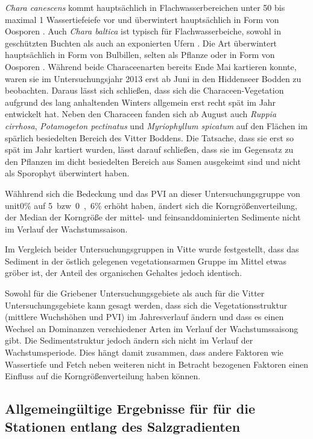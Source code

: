 \textit{Chara canescens} kommt hauptsächlich in Flachwasserbereichen unter \unit{50}{\centi\metre}  bis maximal \unit{1}{\metre} Wassertiefeiefe \citep{blindow_2003} vor und überwintert hauptsächlich in Form von Oosporen \cite{wahlstedt_1862}. Auch \textit{Chara baltica} ist typisch für Flachwasserbeiche, sowohl in geschützten Buchten als auch an exponierten Ufern \citep{blumel_2003}. Die Art überwintert hauptsächlich in Form von Bulbillen, selten als Pflanze oder in Form von Oosporen \cite{blumel_2003}. Während \cite{flugge_2004} beide Characeenarten  bereits Ende Mai kartieren konnte, waren sie im Untersuchungsjahr 2013 erst ab Juni in den Hiddenseer Bodden zu beobachten. Daraus lässt sich schließen, dass sich die Characeen-Vegetation aufgrund des lang anhaltenden Winters allgemein erst recht spät im Jahr entwickelt hat.
Neben den Characeen fanden sich ab August auch \textit{Ruppia cirrhosa}, \textit{Potamogeton pectinatus} und \textit{Myriophyllum spicatum} auf den Flächen im spärlich besiedelten Bereich des Vitter Boddens. Die Tatsache, dass sie erst so spät im Jahr kartiert wurden, lässt darauf schließen, dass sie im Gegensatz zu den Pflanzen im dicht besiedelten Bereich aus Samen ausgekeimt sind und nicht als Sporophyt überwintert haben.

Wähhrend sich die Bedeckung und das PVI an dieser Untersuchungsgruppe von unit{0}{\%} auf \unit{5 bzw. 0,6}{\%} erhöht haben, ändert sich die Korngrößenverteilung, der Median der Korngröße der mittel- und feinsanddominierten Sedimente nicht im Verlauf der Wachstumssaison.

Im Vergleich beider Untersuchungsgruppen in Vitte wurde festgestellt, dass das Sediment in der östlich gelegenen vegetationsarmen Gruppe im Mittel etwas gröber ist, der Anteil des organischen Gehaltes jedoch identisch. 

Sowohl für die Griebener Untersuchungsgebiete als auch für die Vitter Untersuchungsgebiete kann gesagt werden, dass sich die Vegetationsstruktur (mittlere Wuchshöhen und PVI) im Jahresverlauf ändern und dass es einen Wechsel an Dominanzen verschiedener Arten im Verlauf der Wachstumssaisong gibt. Die Sedimentstruktur jedoch ändern sich nicht im Verlauf der Wachstumsperiode. Dies hängt damit zusammen, dass andere Faktoren wie Wassertiefe und Fetch neben weiteren nicht in Betracht bezogenen Faktoren einen Einfluss auf die Korngrößenverteilung haben können. 


\subsection{Allgemeingültige Ergebnisse für für die Stationen entlang des Salzgradienten}
